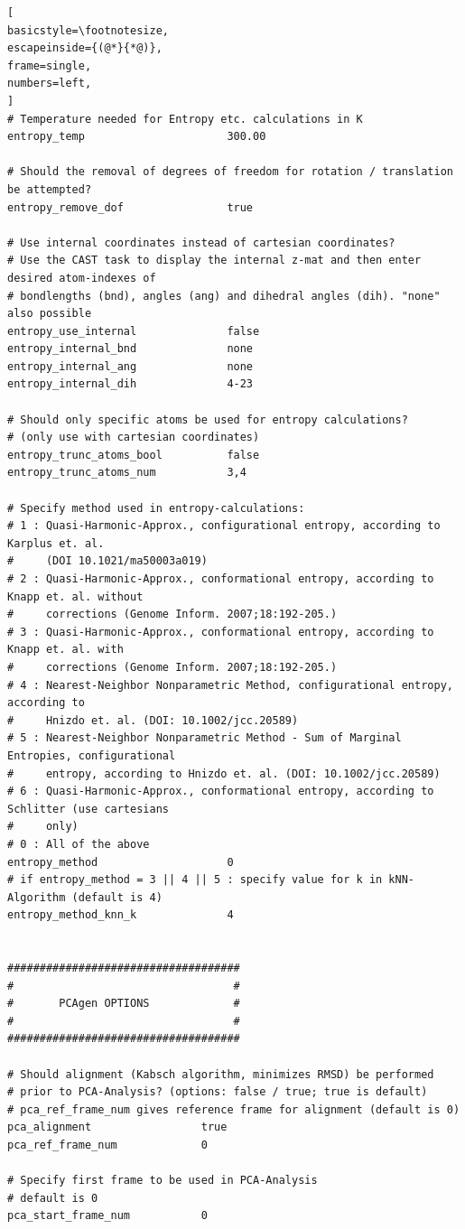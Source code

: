 \documentclass[a4paper,11pt]{scrartcl}
\begin{document}
\begin{lstlisting}[
basicstyle=\footnotesize,
escapeinside={(@*}{*@)},
frame=single,
numbers=left,
]
# Temperature needed for Entropy etc. calculations in K
entropy_temp                      300.00

# Should the removal of degrees of freedom for rotation / translation be attempted?
entropy_remove_dof                true

# Use internal coordinates instead of cartesian coordinates?
# Use the CAST task to display the internal z-mat and then enter desired atom-indexes of
# bondlengths (bnd), angles (ang) and dihedral angles (dih). "none" also possible
entropy_use_internal              false
entropy_internal_bnd              none
entropy_internal_ang              none
entropy_internal_dih              4-23

# Should only specific atoms be used for entropy calculations?
# (only use with cartesian coordinates)
entropy_trunc_atoms_bool          false
entropy_trunc_atoms_num           3,4

# Specify method used in entropy-calculations:
# 1 : Quasi-Harmonic-Approx., configurational entropy, according to Karplus et. al.
#     (DOI 10.1021/ma50003a019)
# 2 : Quasi-Harmonic-Approx., conformational entropy, according to Knapp et. al. without
#     corrections (Genome Inform. 2007;18:192-205.)
# 3 : Quasi-Harmonic-Approx., conformational entropy, according to Knapp et. al. with 
#     corrections (Genome Inform. 2007;18:192-205.)
# 4 : Nearest-Neighbor Nonparametric Method, configurational entropy, according to 
#     Hnizdo et. al. (DOI: 10.1002/jcc.20589)
# 5 : Nearest-Neighbor Nonparametric Method - Sum of Marginal Entropies, configurational
#     entropy, according to Hnizdo et. al. (DOI: 10.1002/jcc.20589)
# 6 : Quasi-Harmonic-Approx., conformational entropy, according to Schlitter (use cartesians
#     only)
# 0 : All of the above
entropy_method                    0
# if entropy_method = 3 || 4 || 5 : specify value for k in kNN-Algorithm (default is 4)
entropy_method_knn_k              4


####################################
#                                  #
#     	PCAgen OPTIONS             #
#                                  #
####################################

# Should alignment (Kabsch algorithm, minimizes RMSD) be performed
# prior to PCA-Analysis? (options: false / true; true is default)
# pca_ref_frame_num gives reference frame for alignment (default is 0)
pca_alignment                 true
pca_ref_frame_num             0

# Specify first frame to be used in PCA-Analysis
# default is 0
pca_start_frame_num           0


\end{lstlisting}
\end{document}
